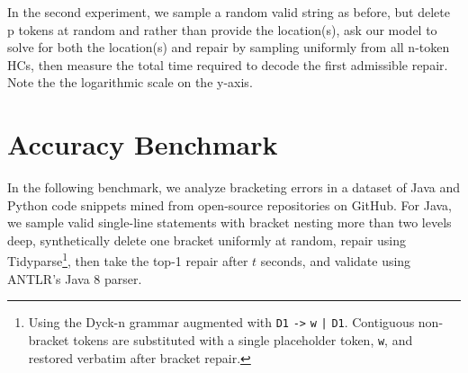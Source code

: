 \documentclass[sigplan,nonacm]{acmart}\settopmatter{printfolios=false,printccs=false,printacmref=false}
\begin{document}
\noindent In the second experiment, we sample a random valid string as before, but delete p tokens at random and rather than provide the location(s), ask our model to solve for both the location(s) and repair by sampling uniformly from all n-token HCs, then measure the total time required to decode the first admissible repair. Note the the logarithmic scale on the y-axis.

\begin{figure}[H]
\hspace{-0.25cm}
\end{figure}

\section{Accuracy Benchmark}

In the following benchmark, we analyze bracketing errors in a dataset of Java and Python code snippets mined from open-source repositories on GitHub. For Java, we sample valid single-line statements with bracket nesting more than two levels deep, synthetically delete one bracket uniformly at random, repair using Tidyparse\footnote{\label{note1}Using the Dyck-n grammar augmented with \texttt{D1} {\color{blue}\texttt{->}} \texttt{w} {\color{blue}\texttt{|}} \texttt{D1}. Contiguous non-bracket tokens are substituted with a single placeholder token, \texttt{w}, and restored verbatim after bracket repair.}, then take the top-1 repair after $t$ seconds, and validate using ANTLR's Java 8 parser.
\end{document}
